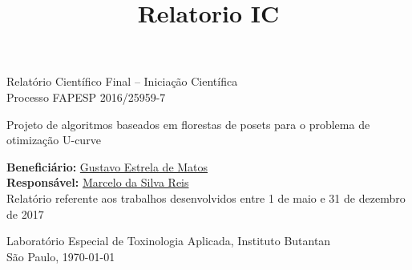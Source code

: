 \documentclass[12pt]{article}
\title{Relatorio IC}
\begin{document}
%
\doublespacing

\begin{titlepage}
    \vfill 
    \begin{center}
        {\Large Relatório Científico Final -- Iniciação Científica\\
         \bigskip
         Processo FAPESP 2016/25959-7
        }
        
        \bigskip
        \bigskip
    
        {\LARGE Projeto de algoritmos baseados em florestas de posets 
                para o problema de otimização U-curve}

        \bigskip
        \bigskip
        {\Large {\bf Beneficiário:} \href{mailto:gustavo.estrela.matos@usp.br}{Gustavo Estrela de Matos}\\ 
        
        {\bf Responsável:} \href{mailto:marcelo.reis@butantan.gov.br}{Marcelo da Silva Reis}\\

        \bigskip
        \bigskip
        \bigskip
        \bigskip
        \bigskip
        \bigskip
        \bigskip
Relatório referente aos trabalhos desenvolvidos entre 1 de maio e 31 de dezembro de 2017

        \bigskip
        \bigskip
        \bigskip
        \bigskip
        \bigskip
        \bigskip
        \bigskip

Laboratório Especial de Toxinologia Aplicada, Instituto Butantan\\
        \bigskip
        São Paulo, \today\\
        }

        \bigskip
        \bigskip

       

\end{center}
\end{titlepage}


\tableofcontents

\pagebreak
\end{document}
